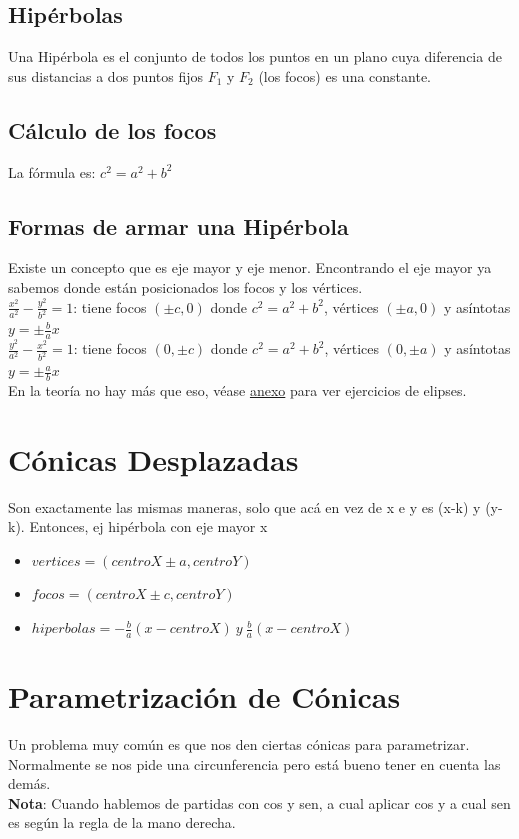 \documentclass[10pt,a4paper]{article}
\begin{document}
\subsection*{Hipérbolas}
Una Hipérbola es el conjunto de todos los puntos en un plano cuya diferencia de sus distancias a dos puntos fijos $F_{1}$ y $F_{2}$ (los focos) es una constante. 
\subsection*{Cálculo de los focos}
La fórmula es: $c^{2} = a^{2} + b^{2}$
\subsection*{Formas de armar una Hipérbola}
Existe un concepto que es eje mayor y eje menor. Encontrando el eje mayor ya sabemos donde están posicionados los focos y los vértices. \\
$\frac{x^{2}}{a^{2}} - \frac{y^{2}}{b^{2}} = 1$: tiene focos $(\pm c, 0)$ donde $c^{2} = a^{2} + b^{2}$, vértices $(\pm a, 0)$ y asíntotas $y = \pm \frac{b}{a}x$ \\
$\frac{y^{2}}{a^{2}} - \frac{x^{2}}{b^{2}} = 1$: tiene focos $(0,  \pm c)$ donde $c^{2} = a^{2} + b^{2}$, vértices $(0, \pm a)$ y asíntotas $y = \pm \frac{a}{b}x$ \\
En la teoría no hay más que eso, véase \hyperref[subsec:hiperbolas_ejercicios]{anexo} para ver ejercicios de elipses. 
\section*{Cónicas Desplazadas}
Son exactamente las mismas maneras, solo que acá en vez de x e y es (x-k) y (y-k).
Entonces, ej hipérbola con eje mayor x
\begin{itemize}
    \item $vertices = (centroX \pm a, centroY)$
    \item $focos = (centroX \pm c, centroY)$
    \item $hiperbolas = -\frac{b}{a}(x - centroX) \ y \ \frac{b}{a}(x - centroX) $
\end{itemize}
\section*{Parametrización de Cónicas}
Un problema muy común es que nos den ciertas cónicas para parametrizar. Normalmente se nos pide una circunferencia pero está bueno tener en cuenta las demás. \\
\textbf{Nota}: Cuando hablemos de partidas con cos y sen, a cual aplicar cos y a cual sen es según la regla de la mano derecha. 
\end{document}
